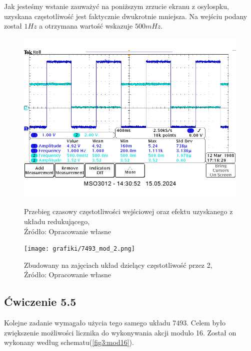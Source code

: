 \documentclass{article}
\begin{document}
      Jak jesteśmy wstanie zauważyć na poniższym zrzucie ekranu z osylospku, uzyskana częstotliwość jest faktycznie dwukrotnie mniejsza. Na wejściu podany został $1Hz$ a otrzymana wartość wskazuje $500mHz$.

      \begin{figure}[!ht]
        \begin{minipage}{.5\textwidth}
          \centering
          \includegraphics[scale=0.4]{grafiki/5.4_mod_2_freq.png}
          \caption{Przebieg czasowy częstotliwości wejściowej oraz efektu uzyskanego z układu redukującego,
          \\Źródło: Opracowanie własne}
        \end{minipage}
        \begin{minipage}{.5\textwidth}
          \centering
          \texttt{[image: grafiki/7493\_mod\_2.png]}
          \caption{Zbudowany na zajęciach układ dzielący częstotliwość przez 2,
          \\Źródło: Opracowanie własne}
        \end{minipage}
      \end{figure}

    \subsection{Ćwiczenie 5.5}
      Kolejne zadanie wymagało użycia tego samego układu 7493. Celem było zwiększenie możliwości licznika do wykonywania akcji modulo 16. Został on wykonany według schematu(\ref{fig3:mod16}).
\end{document}
